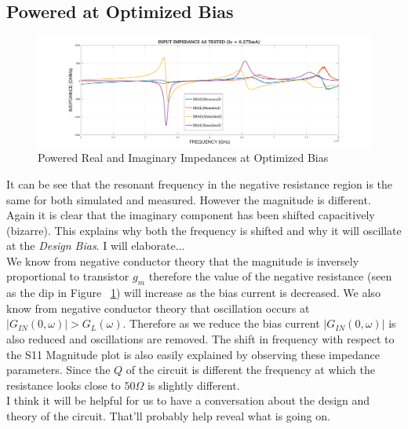 \documentclass{article}                                                         %
\begin{document}
\subsection{Powered at Optimized Bias}
\begin{figure}[H]
  \centering
  \includegraphics[width=1\textwidth] {Figures/Impedance_optimizedTest.png}
  \caption{Powered Real and Imaginary Impedances at Optimized Bias}
    \label{fig:f5}
\end{figure}

It can be see that the resonant frequency in the negative resistance region is the same for both simulated and measured. However the
magnitude is different. Again it is clear that the imaginary component has been shifted capacitively (bizarre). This explains why both the frequency
is shifted and why it will oscillate at the \textit{Design Bias}. I will elaborate... \\

\vspace{2mm}We know from negative conductor theory that the magnitude is inversely proportional to transistor $g_m$ therefore
the value of the negative resistance (seen as the dip in Figure ~\ref{fig:f5}) will increase as the bias current is decreased.
We also know from negative conductor theory that oscillation occurs at $|G_{IN}(0,\omega)| > G_L(\omega)$. Therefore as we reduce the
bias current $|G_{IN}(0,\omega)|$ is also reduced and oscillations are removed. The shift in frequency with respect to the S11 Magnitude plot
is also easily explained by observing these impedance parameters. Since the $ Q $ of the circuit is different the frequency at which the
resistance looks close to $ 50 \Omega$ is slightly different.\\

\vspace{3mm} I think it will be helpful for us to have a conversation about the design and theory of the circuit. That'll probably help
reveal what is going on.
\clearpage
\end{document}
